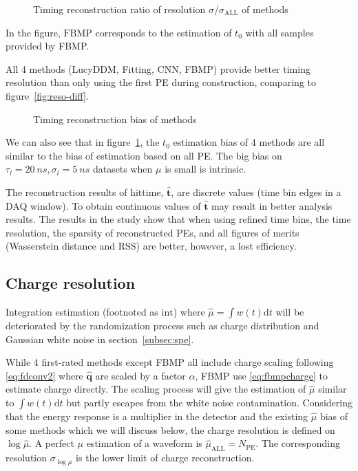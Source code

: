 \begin{figure}[H]
    \centering
    \resizebox{\textwidth}{!}{}
    \caption{\label{fig:deltamethods} Timing reconstruction ratio of resolution $\sigma/\sigma_{\mathrm{ALL}}$ of methods}
\end{figure}

In the figure, $\mathrm{FBMP}$ corresponds to the estimation of $t_{0}$ with all samples provided by FBMP. 

All 4 methods (LucyDDM, Fitting, CNN, FBMP) provide better timing resolution than only using the first PE during construction, comparing to figure~\ref{fig:reso-diff}. 

\begin{figure}[H]
    \centering
    \resizebox{\textwidth}{!}{}
    \caption{\label{fig:biasmethods}Timing reconstruction bias of methods}
\end{figure}

We can also see that in figure~\ref{fig:deltamethods}, the $t_0$ estimation bias of 4 methods are all similar to the bias of estimation based on all PE. The big bias on $\tau_l=\SI{20}{ns}, \sigma_l=\SI{5}{ns}$ datasets when $\mu$ is small is intrinsic. 


The reconstruction results of hittime, $\bm{\hat{t}}$, are discrete values (time bin edges in a DAQ window). To obtain continuous values of $\bm{\hat{t}}$ may result in better analysis results. The results in the study show that when using refined time bins, the time resolution, the sparsity of reconstructed PEs, and all figures of merits (Wasserstein distance and RSS) are better, however, a lost efficiency. 

\subsection{Charge resolution}
\label{subsec:chargereconstruction}

Integration estimation (footnoted as $\mathrm{int}$) where $\hat{\mu}=\int w(t)\mathrm{d}t$ will be deteriorated by the randomization process such as charge distribution and Gaussian white noise in section~\ref{subsec:spe}. 

While 4 first-rated methods except FBMP all include charge scaling following \eqref{eq:fdconv2} where $\bm{\hat{q}}$ are scaled by a factor $\alpha$, FBMP use \eqref{eq:fbmpcharge} to estimate charge directly. The scaling process will give the estimation of $\hat{\mu}$ similar to $\int w(t)\mathrm{d}t$ but partly escapes from the white noise contamination. Considering that the energy response is a multiplier in the detector and the existing $\hat{\mu}$ bias of some methods which we will discuss below, the charge resolution is defined on $\log{\hat{\mu}}$. A perfect $\mu$ estimation of a waveform is $\hat{\mu}_\mathrm{ALL}=N_\mathrm{PE}$. The corresponding resolution $\sigma_{\log\mu}$ is the lower limit of charge reconstruction. 

